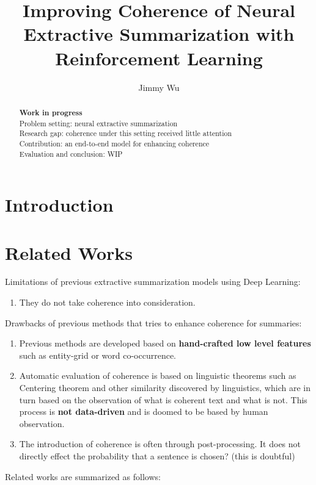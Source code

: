 \documentclass[]{article}
\title{Improving Coherence of Neural Extractive Summarization with Reinforcement Learning}  %
\author{Jimmy Wu}
\begin{document}
\maketitle

\begin{abstract}
\textbf{Work in progress}\\
Problem setting: neural extractive summarization \\
Research gap: coherence under this setting received little attention \\
Contribution: an end-to-end model for enhancing coherence \\
Evaluation and conclusion: WIP \\

\end{abstract}

\section{Introduction}




\section{Related Works}
Limitations of previous extractive summarization models using Deep Learning:
\begin{enumerate}
	\item They do not take coherence into consideration.
\end{enumerate}


Drawbacks of previous methods that tries to enhance coherence for summaries:
\begin{enumerate}
	\item Previous methods are developed based on \textbf{hand-crafted low level features} such as entity-grid or word co-occurrence.
	\item Automatic evaluation of coherence is based on linguistic theorems such as Centering theorem and other similarity discovered by linguistics, which are in turn based on the observation of what is coherent text and what is not. This process is \textbf{not data-driven} and is doomed to be based by human observation.
	\item The introduction of coherence is often through post-processing. It does not directly effect the probability that a sentence is chosen? (this is doubtful)
\end{enumerate}

Related works are summarized as follows:
\end{document}
